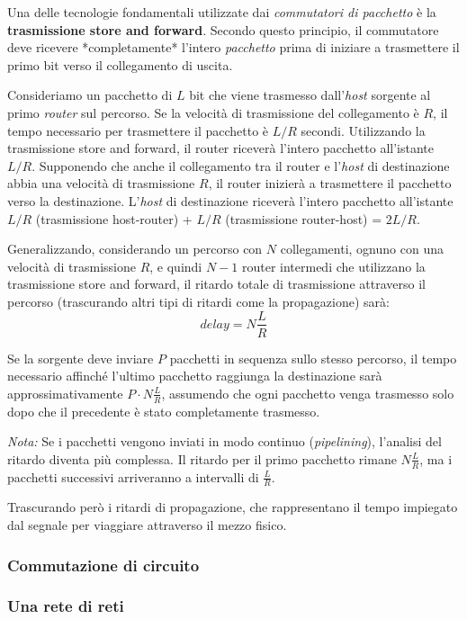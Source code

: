 Una delle tecnologie fondamentali utilizzate dai \textit{commutatori di pacchetto} è la \textbf{trasmissione store and forward}. Secondo questo principio, il commutatore deve ricevere *completamente* l'intero \textit{pacchetto} prima di iniziare a trasmettere il primo bit verso il collegamento di uscita.

Consideriamo un pacchetto di $L$ bit che viene trasmesso dall'\textit{host} sorgente al primo \textit{router} sul percorso. Se la velocità di trasmissione del collegamento è $R$, il tempo necessario per trasmettere il pacchetto è $L/R$ secondi. Utilizzando la trasmissione store and forward, il router riceverà l'intero pacchetto all'istante $L/R$. Supponendo che anche il collegamento tra il router e l'\textit{host} di destinazione abbia una velocità di trasmissione $R$, il router inizierà a trasmettere il pacchetto verso la destinazione. L'\textit{host} di destinazione riceverà l'intero pacchetto all'istante $L/R$ (trasmissione host-router) + $L/R$ (trasmissione router-host) = $2L/R$.

Generalizzando, considerando un percorso con $N$ collegamenti, ognuno con una velocità di trasmissione $R$, e quindi $N-1$ router intermedi che utilizzano la trasmissione store and forward, il ritardo totale di trasmissione attraverso il percorso (trascurando altri tipi di ritardi come la propagazione) sarà:
\[
  delay = N \frac{L}{R}
\]

Se la sorgente deve inviare $P$ pacchetti in sequenza sullo stesso percorso, il tempo necessario affinché l'ultimo pacchetto raggiunga la destinazione sarà approssimativamente $P \cdot N \frac{L}{R}$, assumendo che ogni pacchetto venga trasmesso solo dopo che il precedente è stato completamente trasmesso.

\textit{Nota:} Se i pacchetti vengono inviati in modo continuo (\textit{pipelining}), l'analisi del ritardo diventa più complessa. Il ritardo per il primo pacchetto rimane $N \frac{L}{R}$, ma i pacchetti successivi arriveranno a intervalli di $\frac{L}{R}$.

Trascurando però i ritardi di propagazione, che rappresentano il tempo impiegato dal segnale per viaggiare attraverso il mezzo fisico.

\subsubsection{Commutazione di circuito}
\subsubsection{Una rete di reti}

